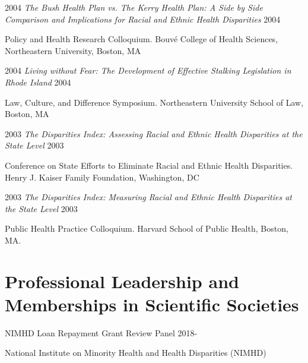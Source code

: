 \documentclass[10pt,]{article}
\begin{document}
{{{{{{{{{{{{{{\begin{hangparas}{.5in}{1}
2004 \hspace*{0.3cm} {\textit {The Bush Health Plan vs. The Kerry Health Plan: A Side by Side Comparison and Implications for Racial and Ethnic Health Disparities}} \hfill 2004 
\vspace{-2.5mm}
\begin{adjustwidth}{0.5cm}{1cm}
Policy and Health Research Colloquium. Bouvé College of Health Sciences, Northeastern University, Boston, MA
\end{adjustwidth}

2004 \hspace*{0.3cm} {\textit {Living without Fear: The Development of Effective Stalking Legislation in Rhode Island}} \hfill 2004 
\vspace{-2.5mm}
\begin{adjustwidth}{0.5cm}{1cm}
Law, Culture, and Difference Symposium. Northeastern University School of Law, Boston, MA
\end{adjustwidth}

2003 \hspace*{0.3cm} {\textit {The Disparities Index: Assessing Racial and Ethnic Health Disparities at the State Level}} \hfill 2003 
\vspace{-2.5mm}
\begin{adjustwidth}{0.5cm}{1cm}
Conference on State Efforts to Eliminate Racial and Ethnic Health Disparities. Henry J. Kaiser Family Foundation, Washington, DC
\end{adjustwidth}

2003 \hspace*{0.3cm} {\textit {The Disparities Index: Measuring Racial and Ethnic Health Disparities at the State Level}} \hfill 2003 
\vspace{-2.5mm}
\begin{adjustwidth}{0.5cm}{1cm}
Public Health Practice Colloquium. Harvard School of Public Health, Boston, MA.
\end{adjustwidth}

\end{hangparas}

\section{\Large \sc Professional Leadership and Memberships in Scientific Societies}

NIMHD Loan Repayment Grant Review Panel \hfill {2018-{\small{}}}
\vspace{-2.5mm}
\begin{adjustwidth}{0.5cm}{1cm}
National Institute on Minority Health and Health Disparities (NIMHD) 
\end{adjustwidth}

}}}}}}}}}}}}}}
\end{document}
